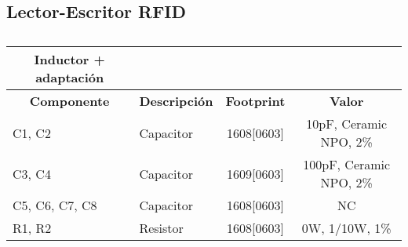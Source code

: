 \subsection{Lector-Escritor RFID}
\begin{table}[htbp]
\begin{center}
\begin{tabular}{|l|l|c|c|}
\hline
\multicolumn{1}{|c|}{\textbf{Inductor + adaptación}} & \multicolumn{1}{c|}{\textbf{}} & \textbf{} & \textbf{} \\ \hline
\multicolumn{1}{|c|}{\textbf{Componente}} & \multicolumn{1}{c|}{\textbf{Descripción}} & \textbf{ Footprint} & \textbf{Valor} \\ \hline
C1, C2 & Capacitor & 1608[0603] & 10pF,   Ceramic NPO, 2\% \\ \hline
C3, C4 & Capacitor & 1609[0603] & 100pF, Ceramic NPO, 2\% \\ \hline
C5, C6, C7, C8 & Capacitor & 1608[0603] &  NC \\ \hline
R1,  R2 & Resistor & 1608[0603] & 0W,  1/10W,  1\% \\ \hline
\end{tabular}
\end{center}
\caption{}
\label{}
\end{table}

